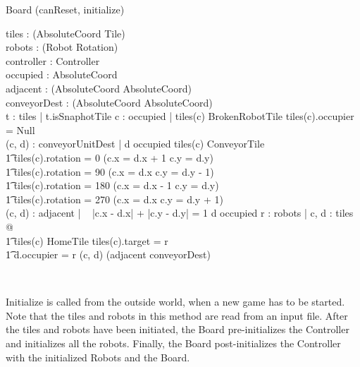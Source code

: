 \documentclass[12pt]{article}
\begin{document}
\begin{class}{Board}
\upharpoonright (canReset, initialize) \\
\begin{state}
tiles : \power (AbsoluteCoord \fun \: \downarrow \! Tile) \\
robots : \power (Robot \fun Rotation) \\
\also \also \also
controller : Controller \\
occupied : \power AbsoluteCoord \\
adjacent : \power (AbsoluteCoord \rel AbsoluteCoord) \\
conveyorDest : \power (AbsoluteCoord \pinj AbsoluteCoord) \\
\where
\forall t : \ran tiles | \neg t.isSnaphotTile
\also \also \also \also
\forall c : occupied | tiles(c) \in BrokenRobotTile \vee
tiles(c).occupier \not = Null \\
\also \also \also \also
\forall (c, d) : conveyorUnitDest | d \not \in occupied \; \wedge tiles(c) \in ConveyorTile \; \; \wedge \\ \t1
        tiles(c).rotation = 0 \Rightarrow (c.x = d.x + 1 \wedge c.y = d.y) \; \; \wedge \\ \t1
        tiles(c).rotation = 90 \Rightarrow (c.x = d.x \wedge c.y = d.y - 1) \; \; \wedge \\ \t1
        tiles(c).rotation = 180 \Rightarrow (c.x = d.x - 1 \wedge c.y = d.y) \; \; \wedge \\ \t1
        tiles(c).rotation = 270 \Rightarrow (c.x = d.x \wedge c.y = d.y + 1) \; \; \\
\also \also \also \also
\forall (c, d) : adjacent | ~ |\!c.x - d.x\!| + |\!c.y - d.y\!| = 1 \wedge d \not \in occupied
\also \also \also \also
\forall r : robots | \exists c, d : \dom tiles @  \\ \t1 tiles(c) \in HomeTile \wedge tiles(c).target = r \; \; \wedge \\ \t1
d.occupier = r \wedge (c, d) \in (adjacent \cup conveyorDest)\star
\end{state} \\
\begin{classcom}
Initialize is called from the outside world, when a new game has to be started. Note that the tiles and robots in this method are read from an input file. After the tiles and robots have been initiated, the Board pre-initializes the Controller and initializes all the robots. Finally, the Board post-initializes the Controller with the initialized Robots and the Board.
\end{classcom} \\

\end{class}
\end{document}

